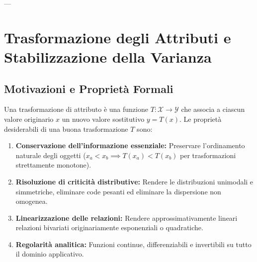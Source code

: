 \FloatBarrier

---

\section{Trasformazione degli Attributi e Stabilizzazione della Varianza}

\subsection{Motivazioni e Proprietà Formali}
Una trasformazione di attributo è una funzione $T: \mathcal{X} \to \mathcal{Y}$ che associa a ciascun valore originario $x$ un nuovo valore sostitutivo $y = T(x)$.
Le proprietà desiderabili di una buona trasformazione $T$ sono:
\begin{enumerate}
    \item \textbf{Conservazione dell'informazione essenziale:} Preservare l'ordinamento naturale degli oggetti ($x_a < x_b \implies T(x_a) < T(x_b)$ per trasformazioni strettamente monotone).
    \item \textbf{Risoluzione di criticità distributive:} Rendere le distribuzioni unimodali e simmetriche, eliminare code pesanti ed eliminare la dispersione non omogenea.
    \item \textbf{Linearizzazione delle relazioni:} Rendere approssimativamente lineari relazioni bivariati originariamente esponenziali o quadratiche.
    \item \textbf{Regolarità analitica:} Funzioni continue, differenziabili e invertibili su tutto il dominio applicativo.
\end{enumerate}

